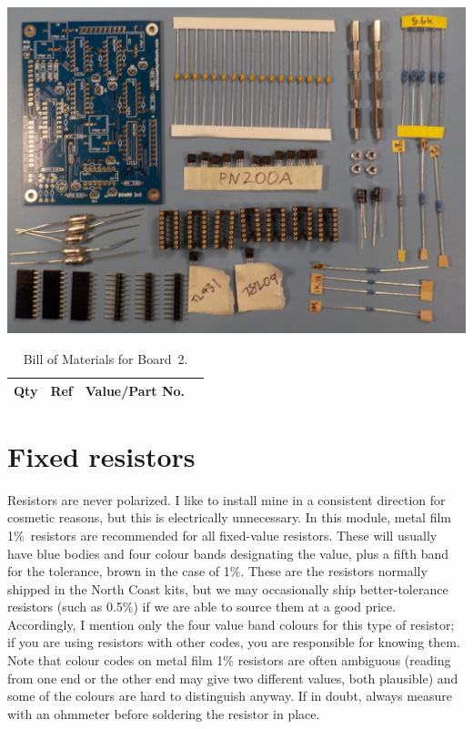 \noindent\includegraphics[width=\linewidth]{board2-parts.jpg}

\begin{table}
{\centering
{}
\vspace{\baselineskip}

\begin{tabular}{rp{1in}cp{3in}}
  \textbf{Qty} & \textbf{Ref} & \textbf{Value/Part No.} & \\ \hline

\end{tabular}\par}
\caption{Bill of Materials for Board~2.}\label{tab:b2bom}
\end{table}

\newpage

\section{Fixed resistors}

Resistors are never polarized.  I like to install mine in a consistent
direction for cosmetic reasons, but this is electrically unnecessary.  In
this module, metal film 1\%\ resistors are recommended for all fixed-value
resistors.  These will usually have blue bodies and four colour bands
designating the value, plus a fifth band for the tolerance, brown in the
case of 1\%.  These are the resistors normally shipped in the
North Coast kits, but we may occasionally ship better-tolerance resistors (such
as 0.5\%) if we are able to source them at a good price. 
Accordingly, I mention only the four value band colours for this type of
resistor; if you are using resistors with other codes, you are responsible
for knowing them.  Note that colour codes on metal film 1\% resistors are
often ambiguous (reading from one end or the other end may give two
different values, both plausible) and some of the colours are hard to
distinguish anyway.  If in doubt, always measure with an ohmmeter before
soldering the resistor in place.

